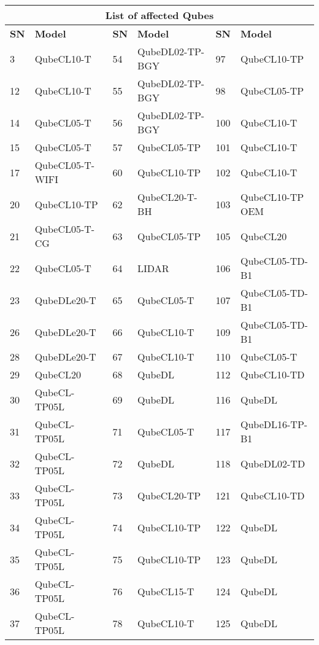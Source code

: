 \begin{table}[!ht]
    \centering
    \begin{tabular}{|l|l||l|l||l|l|}
    \hline
        \multicolumn{6}{c}{\textbf{List of affected Qubes}}\\ 
        \hline
        \textbf{SN} &  \textbf{Model}  & \textbf{SN} &  \textbf{Model}  & \textbf{SN} &  \textbf{Model}  \\ 
        \hline  \hline
        3 & QubeCL10-T & 54 & QubeDL02-TP-BGY & 97 & QubeCL10-TP \\ \hline
        12 & QubeCL10-T & 55 & QubeDL02-TP-BGY & 98 & QubeCL05-TP \\ \hline
        14 & QubeCL05-T & 56 & QubeDL02-TP-BGY & 100 & QubeCL10-T \\ \hline
        15 & QubeCL05-T & 57 & QubeCL05-TP & 101 & QubeCL10-T \\ \hline
        17 & QubeCL05-T-WIFI & 60 & QubeCL10-TP & 102 & QubeCL10-T \\ \hline
        20 & QubeCL10-TP & 62 & QubeCL20-T-BH & 103 & QubeCL10-TP OEM \\ \hline
        21 & QubeCL05-T-CG & 63 & QubeCL05-TP & 105 & QubeCL20 \\ \hline
        22 & QubeCL05-T & 64 & LIDAR & 106 & QubeCL05-TD-B1 \\ \hline
        23 & QubeDLe20-T & 65 & QubeCL05-T & 107 & QubeCL05-TD-B1 \\ \hline
        26 & QubeDLe20-T & 66 & QubeCL10-T & 109 & QubeCL05-TD-B1 \\ \hline
        28 & QubeDLe20-T & 67 & QubeCL10-T & 110 & QubeCL05-T \\ \hline
        29 & QubeCL20 & 68 & QubeDL & 112 & QubeCL10-TD \\ \hline
        30 & QubeCL-TP05L & 69 & QubeDL & 116 & QubeDL \\ \hline
        31 & QubeCL-TP05L & 71 & QubeCL05-T & 117 & QubeDL16-TP-B1 \\ \hline
        32 & QubeCL-TP05L & 72 & QubeDL & 118 & QubeDL02-TD \\ \hline
        33 & QubeCL-TP05L & 73 & QubeCL20-TP & 121 & QubeCL10-TD \\ \hline
        34 & QubeCL-TP05L & 74 & QubeCL10-TP & 122 & QubeDL \\ \hline
        35 & QubeCL-TP05L & 75 & QubeCL10-TP & 123 & QubeDL \\ \hline
        36 & QubeCL-TP05L & 76 & QubeCL15-T & 124 & QubeDL \\ \hline
        37 & QubeCL-TP05L & 78 & QubeCL10-T & 125 & QubeDL \\ \hline

\end{tabular}
\end{table}

